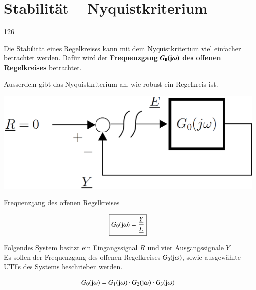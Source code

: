 \section{Stabilität -- Nyquistkriterium}{126}
\label{offener Regelkreis}

Die Stabilität eines Regelkreises kann mit dem Nyquistkriterium viel einfacher betrachtet werden. 
Dafür wird der \textbf{Frequenzgang} $\bm{G_0(\mathrm{j} \omega)}$ \textbf{des offenen Regelkreises} betrachtet.

Ausserdem gibt das Nyquistkriterium an, wie robust ein Regelkreis ist.

\begin{minipage}[c]{0.48\columnwidth}
    \includegraphics[width=\columnwidth]{images/offener_regelkreis.png}
\end{minipage}
\hfill
\begin{minipage}[c]{0.48\columnwidth}
    \begin{center}
        Frequenzgang des offenen Regelkreises
    \end{center}
    $$ \boxed{ G_0(\mathrm{j} \omega) = \frac{\underline{Y}}{\underline{E}} } $$
\end{minipage}



\label{Kreisschaltung mehrere Bloecke}

Folgendes System besitzt ein Eingangssignal $\underline{R}$ und vier Ausgangssignale $\underline{Y}$\\
Es sollen der Frequenzgang des offenen Regelkreises $G_0(\mathrm{j} \omega)$, sowie ausgewählte UTFs des Systems beschrieben werden.

$$ G_0(\mathrm{j} \omega) = G_1(\mathrm{j} \omega) \cdot G_2(\mathrm{j} \omega) \cdot G_3(\mathrm{j} \omega)  $$

